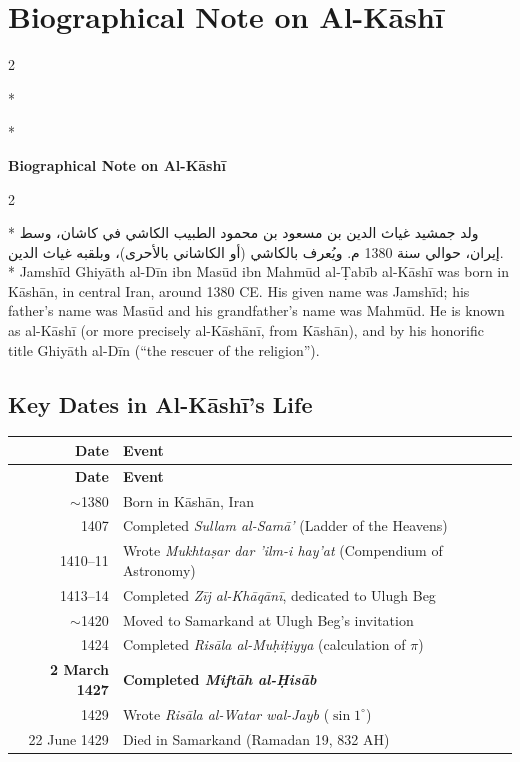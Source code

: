 \documentclass[11pt,a4paper]{article}
\newcommand{\ar}[1]{{\arabicfont\beginR #1\endR}}
\newenvironment{bilingual}{%
  \vspace{0.3em}%
  \begin{paracol}{2}%
}{%
  \end{paracol}%
  \vspace{0.3em}%
}
\begin{document}
\appendix
\section{Biographical Note on Al-K\=ash\=i}
\label{app:biography}

\begin{bilingual}
\switchcolumn[0]*
\begin{center}
\textbf{\Large\color{chapcolor}\ar{نبذة عن حياة الكاشي}}
\end{center}
\switchcolumn[1]*
\begin{center}
\textbf{\Large\color{chapcolor}Biographical Note on Al-K\=ash\=i}
\end{center}
\end{bilingual}

\begin{bilingual}
\switchcolumn[0]*
\ar{ولد جمشيد غياث الدين بن مسعود بن محمود الطبيب الكاشي في كاشان، وسط إيران، حوالي سنة 1380 م. ويُعرف بالكاشي (أو الكاشاني بالأحرى)، وبلقبه غياث الدين.}
\switchcolumn[1]*
Jamsh\=id Ghiy\=ath al-D\=in ibn Mas\=ud ibn Mahm\=ud al-\d{T}ab\=ib al-K\=ash\=i was
born in K\=ash\=an, in central Iran, around 1380 CE. His given name was
Jamsh\=id; his father's name was Mas\=ud and his grandfather's name was
Mahm\=ud. He is known as al-K\=ash\=i (or more precisely al-K\=ash\=an\=i, from
K\=ash\=an), and by his honorific title Ghiy\=ath al-D\=in (``the rescuer of
the religion'').
\end{bilingual}

\subsection{Key Dates in Al-K\=ash\=i's Life}

\begin{longtable}{|r|l|}
\hline
\textbf{Date} & \textbf{Event} \\
\hline
\endfirsthead
\hline
\textbf{Date} & \textbf{Event} \\
\hline
\endhead
$\sim$1380 & Born in K\=ash\=an, Iran \\
\hline
1407 & Completed \textit{Sullam al-Sam\=a'} (Ladder of the Heavens) \\
\hline
1410--11 & Wrote \textit{Mukhta\d{s}ar dar 'ilm-i hay'at} (Compendium of
Astronomy) \\
\hline
1413--14 & Completed \textit{Z\=ij al-Kh\=aq\=an\=i}, dedicated to Ulugh Beg \\
\hline
$\sim$1420 & Moved to Samarkand at Ulugh Beg's invitation \\
\hline
1424 & Completed \textit{Ris\=ala al-Mu\d{h}i\d{t}iyya} (calculation of $\pi$)
\\
\hline
\textbf{2 March 1427} & \textbf{Completed \textit{Mift\=ah al-\d{H}is\=ab}} \\
\hline
1429 & Wrote \textit{Ris\=ala al-Watar wal-Jayb} ($\sin 1^\circ$) \\
\hline
22 June 1429 & Died in Samarkand (Ramadan 19, 832 AH) \\
\hline
\end{longtable}
\end{document}
